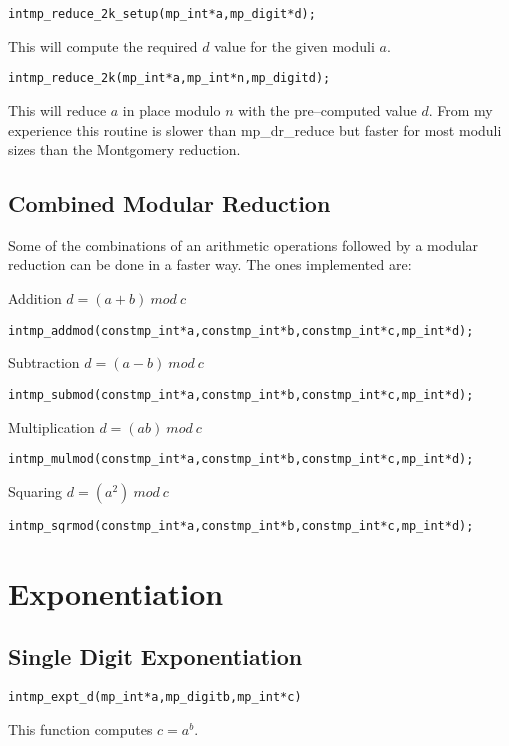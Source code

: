 \documentclass[synpaper]{book}
\def\mod{{\mathit\ mod\ }}
\begin{document}
\begin{alltt}
int mp_reduce_2k_setup(mp_int *a, mp_digit *d);
\end{alltt}

This will compute the required $d$ value for the given moduli $a$.

\begin{alltt}
int mp_reduce_2k(mp_int *a, mp_int *n, mp_digit d);
\end{alltt}

This will reduce $a$ in place modulo $n$ with the pre--computed value $d$.  From my experience this routine is
slower than mp\_dr\_reduce but faster for most moduli sizes than the Montgomery reduction.

\section{Combined Modular Reduction}

Some of the combinations of an arithmetic operations followed by a modular reduction can be done in a faster way. The ones implemented are:

Addition $d = (a + b) \mod c$
\begin{alltt}
int mp_addmod(const mp_int *a, const mp_int *b, const mp_int *c, mp_int *d);
\end{alltt}

Subtraction  $d = (a - b) \mod c$
\begin{alltt}
int mp_submod(const mp_int *a, const mp_int *b, const mp_int *c, mp_int *d);
\end{alltt}

Multiplication $d = (ab) \mod c$
\begin{alltt}
int mp_mulmod(const mp_int *a, const mp_int *b, const mp_int *c, mp_int *d);
\end{alltt}

Squaring  $d = (a^2) \mod c$
\begin{alltt}
int mp_sqrmod(const mp_int *a, const mp_int *b, const mp_int *c, mp_int *d);
\end{alltt}



\chapter{Exponentiation}
\section{Single Digit Exponentiation}
\begin{alltt}
int mp_expt_d (mp_int * a, mp_digit b, mp_int * c)
\end{alltt}
This function computes $c = a^b$.
\end{document}
